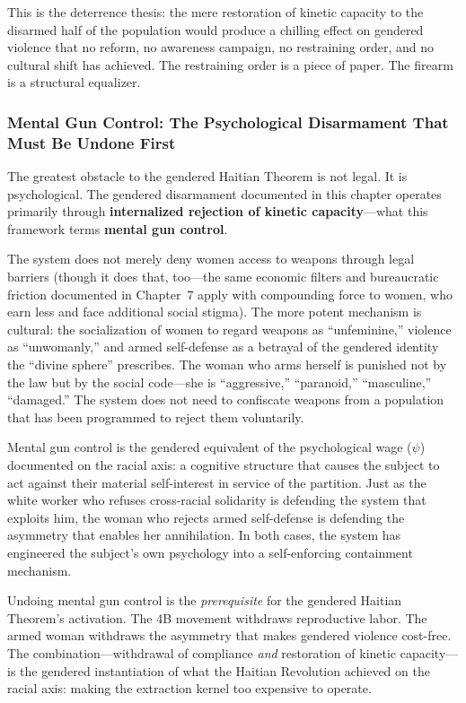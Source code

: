 \documentclass[12pt,openany]{book}
\begin{document}
This is the deterrence thesis: the mere restoration of kinetic capacity to the disarmed half of the population would produce a chilling effect on gendered violence that no reform, no awareness campaign, no restraining order, and no cultural shift has achieved. The restraining order is a piece of paper. The firearm is a structural equalizer.

\subsubsection{Mental Gun Control: The Psychological Disarmament That Must Be Undone First}

The greatest obstacle to the gendered Haitian Theorem is not legal. It is psychological. The gendered disarmament documented in this chapter operates primarily through \textbf{internalized rejection of kinetic capacity}---what this framework terms \textbf{mental gun control}.

The system does not merely deny women access to weapons through legal barriers (though it does that, too---the same economic filters and bureaucratic friction documented in Chapter~7 apply with compounding force to women, who earn less and face additional social stigma). The more potent mechanism is cultural: the socialization of women to regard weapons as ``unfeminine,'' violence as ``unwomanly,'' and armed self-defense as a betrayal of the gendered identity the ``divine sphere'' prescribes. The woman who arms herself is punished not by the law but by the social code---she is ``aggressive,'' ``paranoid,'' ``masculine,'' ``damaged.'' The system does not need to confiscate weapons from a population that has been programmed to reject them voluntarily.

Mental gun control is the gendered equivalent of the psychological wage ($\psi$) documented on the racial axis: a cognitive structure that causes the subject to act against their material self-interest in service of the partition. Just as the white worker who refuses cross-racial solidarity is defending the system that exploits him, the woman who rejects armed self-defense is defending the asymmetry that enables her annihilation. In both cases, the system has engineered the subject's own psychology into a self-enforcing containment mechanism.

Undoing mental gun control is the \textit{prerequisite} for the gendered Haitian Theorem's activation. The 4B movement withdraws reproductive labor. The armed woman withdraws the asymmetry that makes gendered violence cost-free. The combination---withdrawal of compliance \textit{and} restoration of kinetic capacity---is the gendered instantiation of what the Haitian Revolution achieved on the racial axis: making the extraction kernel too expensive to operate.
\end{document}
